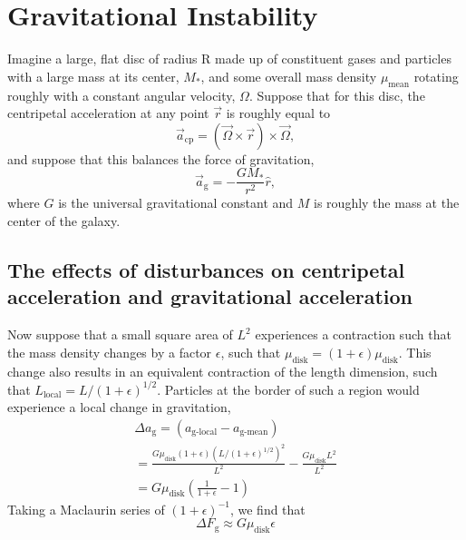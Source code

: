 \documentclass[aps,pra,twocolumn]{revtex4-1}
\begin{document}
\section{\label{section 3} Gravitational Instability}
Imagine a large, flat disc of radius R made up of constituent gases and particles with a large mass at its center, $M_*$, and some overall mass density $\mu_{\text{mean}}$ rotating roughly with a constant angular velocity, $\Omega$. Suppose that for this disc, the centripetal acceleration at any point $\vec{r}$ is roughly equal to 
\begin{equation}
\vec{a}_{\text{cp}} = \left( \vec{\Omega} \times \vec{r} \right) \times \vec{\Omega} ,
\end{equation}
and suppose that this balances the force of gravitation,
\begin{equation}
\vec{a}_{\text{g}} = -\frac{G M_*}{r^2}\hat{r}, 
\end{equation}
where $G$ is the universal gravitational constant and $M$ is roughly the mass at the center of the galaxy.

\subsection{\label{section 3.1} The effects of disturbances on centripetal acceleration and gravitational acceleration}
Now suppose that a small square area of $L^2$ experiences a contraction such that the mass density changes by a factor $\epsilon$, such that $\mu_{\text{disk}} = (1+\epsilon) \mu_{\text{disk}}$. This change also results in an equivalent contraction of the length dimension, such that $L_\text{local} = L/(1 + \epsilon)^{1/2}$. Particles at the border of such a region would experience a local change in gravitation,
\begin{multline}
\Delta a_{\text{g}} =(a_{\text{g-local}} - a_{\text{g-mean}}) \\
= \frac{G\mu_\text{disk} (1 + \epsilon) (L/(1 + \epsilon)^{1/2})^2}{L^2} - \frac{G\mu_{\text{disk}} L^2}{L^2}
\\
= G \mu_{\text{disk}}\left(\frac{1}{1 + \epsilon} - 1  \right) \nonumber
\end{multline}
Taking a Maclaurin series of $(1 + \epsilon)^{-1}$, we find that \cite{toomre1964}
\begin{equation}
\Delta F_\text{g} \approx G\mu_\text{disk}\epsilon
\end{equation}
\end{document}
